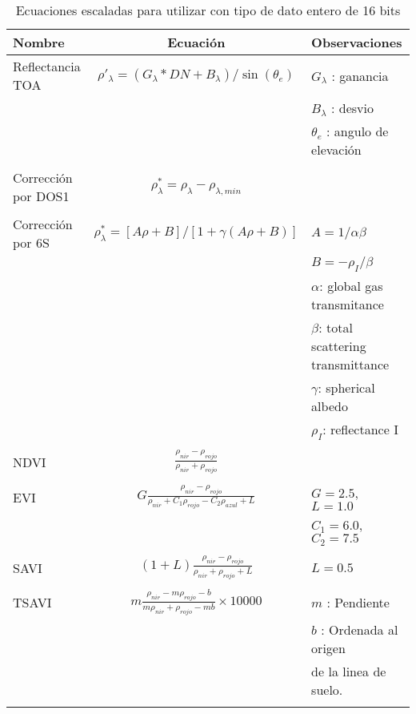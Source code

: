 \documentclass[hidelinks,12pt]{article}
\begin{document}
\begin{table}[hbt]
    \centering
    \begin{tabular}{lcl}
        \toprule
        Nombre & Ecuaci\'on & Observaciones\\
        \midrule
        Reflectancia TOA & $\rho'_\lambda =
        (G_\lambda*DN+B_\lambda)/\sin(\theta_e)$ &
        $G_\lambda$ : ganancia\\
        & & $B_\lambda$ : desvio\\
        & & $\theta_e$ : angulo de elevaci\'on\\
        & & \\
        Corrección por DOS1 & $\rho^*_\lambda = \rho_\lambda -
        \rho_{\lambda,min}$ & \\
        & & \\
        Corrección por 6S & $\rho_\lambda^* = [A\rho+B] / [1+\gamma (A\rho+B)]$& $A = 1/\alpha\beta$\\
        & & $B = -\rho_I/\beta$\\
        & & $\alpha$: global gas transmitance\\
        & & $\beta$: total scattering transmittance\\
        & & $\gamma$: spherical albedo\\
        & & $\rho_I$: reflectance I\\
        & & \\
        NDVI & $\frac{\rho_{nir} -
    \rho_{rojo}}{\rho_{nir}+\rho_{rojo}}$ & \\
            & & \\
        EVI & $G\frac{\rho_{nir} -
    \rho_{rojo}}{\rho_{nir}+C_1\rho_{rojo}-C_2\rho_{azul}+L}$ &
        $G=2.5$, $L=1.0$ \\
        & & $C_1=6.0$, $C_2 = 7.5$\\
                & & \\
        SAVI & $(1+L)\frac{\rho_{nir} -
    \rho_{rojo}}{\rho_{nir}+\rho_{rojo}+L}$ & $L = 0.5$\\
                    & & \\
        TSAVI & $m\frac{\rho_{nir} -
        m\rho_{rojo}-b}{m\rho_{nir}+\rho_{rojo}-mb}\times10000$ & $m$ :
        Pendiente \\
        & & $b$ : Ordenada al origen\\
        & & de la linea de suelo.\\
                & & \\
        \bottomrule
    \end{tabular}
    \caption{Ecuaciones escaladas para utilizar con tipo de dato entero de 16
    bits}
\end{table}
\pagebreak
\end{document}

